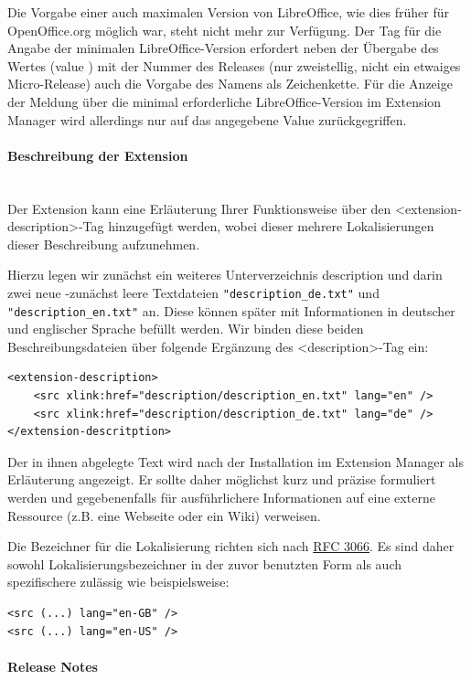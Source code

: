 \documentclass[a4paper,10pt,pagesize,titlepage]{scrbook}
\begin{document}
Die Vorgabe einer auch maximalen Version von LibreOffice, wie dies früher für OpenOffice.org möglich war, steht nicht mehr zur Verfügung. Der Tag für die Angabe der minimalen LibreOffice-Version erfordert neben der Übergabe des Wertes (\glqq value \grqq ) mit der Nummer des Releases (nur zweistellig, nicht ein etwaiges Micro-Release) auch die Vorgabe des Namens als Zeichenkette. Für die Anzeige der Meldung über die minimal erforderliche LibreOffice-Version im Extension Manager wird allerdings nur auf das angegebene Value zurückgegriffen.

\paragraph*{Beschreibung der Extension}$~~$\\

Der Extension kann eine Erläuterung Ihrer Funktionsweise über den <extension-description>-Tag hinzugefügt werden, wobei dieser mehrere Lokalisierungen dieser Beschreibung aufzunehmen.

Hierzu legen wir zunächst ein weiteres Unterverzeichnis \glqq description \grqq und darin zwei neue -zunächst leere Textdateien \verb|"description_de.txt"| und \verb|"description_en.txt"| an. Diese können später mit Informationen in deutscher und englischer Sprache befüllt werden. Wir binden diese beiden Beschreibungsdateien über folgende Ergänzung des <description>-Tag ein:
\begin{lstlisting}
<extension-description>
    <src xlink:href="description/description_en.txt" lang="en" />
    <src xlink:href="description/description_de.txt" lang="de" />
</extension-descritption>
\end{lstlisting}

Der in ihnen abgelegte Text wird nach der Installation im Extension Manager als Erläuterung angezeigt. Er sollte daher möglichst kurz und präzise formuliert werden und gegebenenfalls für ausführlichere Informationen auf eine externe Ressource (z.B. eine Webseite oder ein Wiki) verweisen.

Die Bezeichner für die Lokalisierung richten sich nach \href{https://tools.ietf.org/html/rfc3066}{RFC 3066}. Es sind daher sowohl Lokalisierungsbezeichner in der zuvor benutzten Form als auch spezifischere zulässig wie beispielsweise:
\begin{lstlisting}
<src (...) lang="en-GB" />
<src (...) lang="en-US" />
\end{lstlisting}

\paragraph*{Release Notes}$~~$\\
\end{document}
